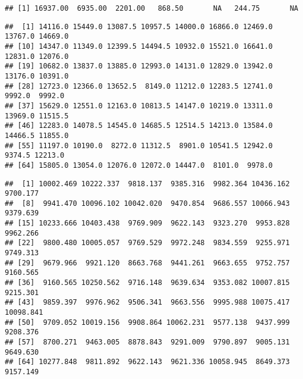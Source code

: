 \documentclass[]{article}
\newenvironment{Shaded}{\begin{snugshade}}{\end{snugshade}}
\newcommand{\FloatTok}[1]{\textcolor[rgb]{0.00,0.00,0.81}{#1}}
\newcommand{\KeywordTok}[1]{\textcolor[rgb]{0.13,0.29,0.53}{\textbf{#1}}}
\newcommand{\NormalTok}[1]{#1}
\newcommand{\OperatorTok}[1]{\textcolor[rgb]{0.81,0.36,0.00}{\textbf{#1}}}
\newcommand{\StringTok}[1]{\textcolor[rgb]{0.31,0.60,0.02}{#1}}
\begin{document}
\begin{Shaded}
\end{Shaded}

\begin{verbatim}
## [1] 16937.00  6935.00  2201.00   868.50       NA   244.75       NA
\end{verbatim}

\begin{Shaded}
\end{Shaded}

\begin{verbatim}
##  [1] 14116.0 15449.0 13087.5 10957.5 14000.0 16866.0 12469.0 13767.0 14669.0
## [10] 14347.0 11349.0 12399.5 14494.5 10932.0 15521.0 16641.0 12831.0 12076.0
## [19] 10682.0 13837.0 13885.0 12993.0 14131.0 12829.0 13942.0 13176.0 10391.0
## [28] 12723.0 12366.0 13652.5  8149.0 11212.0 12283.5 12741.0  9992.0  9992.0
## [37] 15629.0 12551.0 12163.0 10813.5 14147.0 10219.0 13311.0 13969.0 11515.5
## [46] 12283.0 14078.5 14545.0 14685.5 12514.5 14213.0 13584.0 14466.5 11855.0
## [55] 11197.0 10190.0  8272.0 11312.5  8901.0 10541.5 12942.0  9374.5 12213.0
## [64] 15805.0 13054.0 12076.0 12072.0 14447.0  8101.0  9978.0
\end{verbatim}

\begin{Shaded}
\end{Shaded}

\begin{verbatim}
##  [1] 10002.469 10222.337  9818.137  9385.316  9982.364 10436.162  9700.177
##  [8]  9941.470 10096.102 10042.020  9470.854  9686.557 10066.943  9379.639
## [15] 10233.666 10403.438  9769.909  9622.143  9323.270  9953.828  9962.266
## [22]  9800.480 10005.057  9769.529  9972.248  9834.559  9255.971  9749.313
## [29]  9679.966  9921.120  8663.768  9441.261  9663.655  9752.757  9160.565
## [36]  9160.565 10250.562  9716.148  9639.634  9353.082 10007.815  9215.301
## [43]  9859.397  9976.962  9506.341  9663.556  9995.988 10075.417 10098.841
## [50]  9709.052 10019.156  9908.864 10062.231  9577.138  9437.999  9208.376
## [57]  8700.271  9463.005  8878.843  9291.009  9790.897  9005.131  9649.630
## [64] 10277.848  9811.892  9622.143  9621.336 10058.945  8649.373  9157.149
\end{verbatim}
\end{document}
